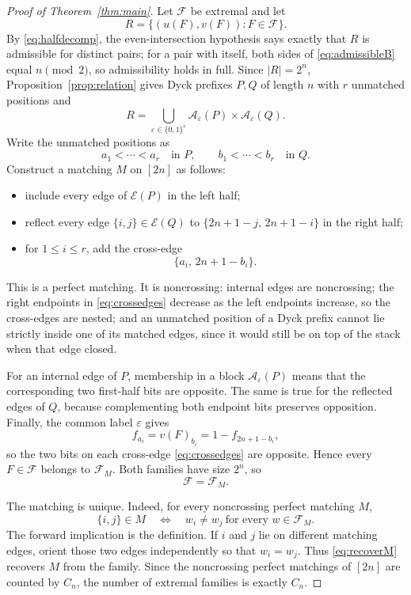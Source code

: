 \documentclass[11pt]{article}
\theoremstyle{definition}
\newcommand{\A}{\mathcal A}
\newcommand{\E}{\mathcal E}
\newcommand{\bits}{\{0,1\}}
\newcommand{\eps}{\varepsilon}
\begin{document}
\begin{proof}[Proof of Theorem~\ref{thm:main}]
Let $\mathcal F$ be extremal and let
\[
 R=\{(u(F),v(F)):F\in\mathcal F\}.
\]
By \eqref{eq:halfdecomp}, the even-intersection hypothesis says exactly that $R$ is admissible for distinct pairs; for a pair with itself, both sides of \eqref{eq:admissibleB} equal $n\pmod2$, so admissibility holds in full.  Since $|R|=2^n$, Proposition~\ref{prop:relation} gives Dyck prefixes $P,Q$ of length $n$ with $r$ unmatched positions and
\[
 R=\bigcup_{\eps\in\bits^r}
 \A_{\eps}(P)\times\A_{\eps}(Q).
\]
Write the unmatched positions as
\[
 a_1<\cdots<a_r\quad\text{in }P,
 \qquad
 b_1<\cdots<b_r\quad\text{in }Q.
\]
Construct a matching $M$ on $[2n]$ as follows:
\begin{itemize}[leftmargin=2em]
 \item include every edge of $\E(P)$ in the left half;
 \item reflect every edge $\{i,j\}\in\E(Q)$ to
 $\{2n+1-j,\,2n+1-i\}$ in the right half;
 \item for $1\le i\le r$, add the cross-edge
 \begin{equation}\label{eq:crossedges}
  \{a_i,\,2n+1-b_i\}.
 \end{equation}
\end{itemize}
This is a perfect matching.  It is noncrossing: internal edges are noncrossing; the right endpoints in \eqref{eq:crossedges} decrease as the left endpoints increase, so the cross-edges are nested; and an unmatched position of a Dyck prefix cannot lie strictly inside one of its matched edges, since it would still be on top of the stack when that edge closed.

For an internal edge of $P$, membership in a block $\A_{\eps}(P)$ means that the corresponding two first-half bits are opposite.  The same is true for the reflected edges of $Q$, because complementing both endpoint bits preserves opposition.  Finally, the common label $\eps$ gives
\[
 f_{a_i}=v(F)_{b_i}
 =1-f_{2n+1-b_i},
\]
so the two bits on each cross-edge \eqref{eq:crossedges} are opposite.  Hence every $F\in\mathcal F$ belongs to $\mathcal F_M$.  Both families have size $2^n$, so
\[
 \mathcal F=\mathcal F_M.
\]

The matching is unique.  Indeed, for every noncrossing perfect matching $M$,
\begin{equation}\label{eq:recoverM}
 \{i,j\}\in M
 \quad\Longleftrightarrow\quad
 w_i\ne w_j\ \text{for every }w\in\mathcal F_M.
\end{equation}
The forward implication is the definition.  If $i$ and $j$ lie on different matching edges, orient those two edges independently so that $w_i=w_j$.  Thus \eqref{eq:recoverM} recovers $M$ from the family.  Since the noncrossing perfect matchings of $[2n]$ are counted by $C_n$, the number of extremal families is exactly $C_n$.
\end{proof}
\end{document}
